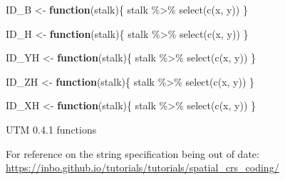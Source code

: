 \documentclass[
]{article}
\newenvironment{Shaded}{\begin{snugshade}}{\end{snugshade}}
\newcommand{\ControlFlowTok}[1]{\textcolor[rgb]{0.13,0.29,0.53}{\textbf{#1}}}
\newcommand{\FunctionTok}[1]{\textcolor[rgb]{0.00,0.00,0.00}{#1}}
\newcommand{\NormalTok}[1]{#1}
\newcommand{\OtherTok}[1]{\textcolor[rgb]{0.56,0.35,0.01}{#1}}
\newcommand{\SpecialCharTok}[1]{\textcolor[rgb]{0.00,0.00,0.00}{#1}}
\begin{document}
\begin{Shaded}
\begin{Highlighting}[]
\NormalTok{ID\_B }\OtherTok{\textless{}{-}} \ControlFlowTok{function}\NormalTok{(stalk)\{}
\NormalTok{  stalk }\SpecialCharTok{\%\textgreater{}\%}
    \FunctionTok{select}\NormalTok{(}\FunctionTok{c}\NormalTok{(x, y))}
\NormalTok{\}}
\end{Highlighting}
\end{Shaded}

\begin{Shaded}
\begin{Highlighting}[]
\NormalTok{ID\_H }\OtherTok{\textless{}{-}} \ControlFlowTok{function}\NormalTok{(stalk)\{}
\NormalTok{  stalk }\SpecialCharTok{\%\textgreater{}\%}
    \FunctionTok{select}\NormalTok{(}\FunctionTok{c}\NormalTok{(x, y)) }
\NormalTok{\}}
\end{Highlighting}
\end{Shaded}

\begin{Shaded}
\begin{Highlighting}[]
\NormalTok{ID\_YH }\OtherTok{\textless{}{-}} \ControlFlowTok{function}\NormalTok{(stalk)\{}
\NormalTok{  stalk }\SpecialCharTok{\%\textgreater{}\%}
    \FunctionTok{select}\NormalTok{(}\FunctionTok{c}\NormalTok{(x, y)) }
\NormalTok{\}}
\end{Highlighting}
\end{Shaded}

\begin{Shaded}
\begin{Highlighting}[]
\NormalTok{ID\_ZH }\OtherTok{\textless{}{-}} \ControlFlowTok{function}\NormalTok{(stalk)\{}
\NormalTok{  stalk }\SpecialCharTok{\%\textgreater{}\%}
    \FunctionTok{select}\NormalTok{(}\FunctionTok{c}\NormalTok{(x, y)) }
\NormalTok{\}}
\end{Highlighting}
\end{Shaded}

\begin{Shaded}
\begin{Highlighting}[]
\NormalTok{ID\_XH }\OtherTok{\textless{}{-}} \ControlFlowTok{function}\NormalTok{(stalk)\{}
\NormalTok{  stalk }\SpecialCharTok{\%\textgreater{}\%}
    \FunctionTok{select}\NormalTok{(}\FunctionTok{c}\NormalTok{(x, y)) }
\NormalTok{\}}
\end{Highlighting}
\end{Shaded}

UTM 0.4.1 functions

For reference on the string specification being out of date:
\url{https://inbo.github.io/tutorials/tutorials/spatial_crs_coding/}
\end{document}
